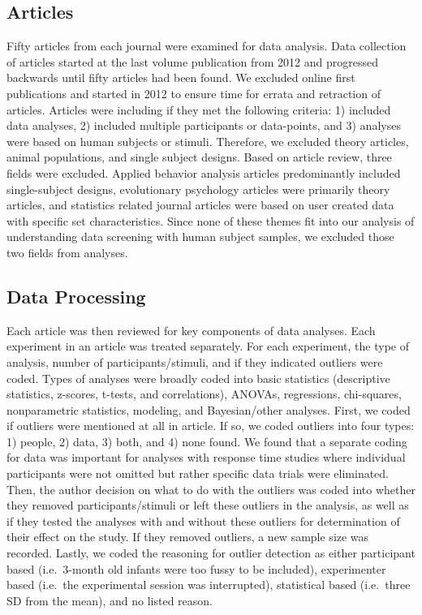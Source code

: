 \documentclass[english,man]{apa6}
\theoremstyle{definition}
\theoremstyle{definition}
\theoremstyle{definition}
\theoremstyle{remark}
\begin{document}
\subsection{Articles}\label{articles}

Fifty articles from each journal were examined for data analysis. Data
collection of articles started at the last volume publication from 2012
and progressed backwards until fifty articles had been found. We
excluded online first publications and started in 2012 to ensure time
for errata and retraction of articles. Articles were including if they
met the following criteria: 1) included data analyses, 2) included
multiple participants or data-points, and 3) analyses were based on
human subjects or stimuli. Therefore, we excluded theory articles,
animal populations, and single subject designs. Based on article review,
three fields were excluded. Applied behavior analysis articles
predominantly included single-subject designs, evolutionary psychology
articles were primarily theory articles, and statistics related journal
articles were based on user created data with specific set
characteristics. Since none of these themes fit into our analysis of
understanding data screening with human subject samples, we excluded
those two fields from analyses.

\subsection{Data Processing}\label{data-processing}

Each article was then reviewed for key components of data analyses. Each
experiment in an article was treated separately. For each experiment,
the type of analysis, number of participants/stimuli, and if they
indicated outliers were coded. Types of analyses were broadly coded into
basic statistics (descriptive statistics, z-scores, t-tests, and
correlations), ANOVAs, regressions, chi-squares, nonparametric
statistics, modeling, and Bayesian/other analyses. First, we coded if
outliers were mentioned at all in article. If so, we coded outliers into
four types: 1) people, 2) data, 3) both, and 4) none found. We found
that a separate coding for data was important for analyses with response
time studies where individual participants were not omitted but rather
specific data trials were eliminated. Then, the author decision on what
to do with the outliers was coded into whether they removed
participants/stimuli or left these outliers in the analysis, as well as
if they tested the analyses with and without these outliers for
determination of their effect on the study. If they removed outliers, a
new sample size was recorded. Lastly, we coded the reasoning for outlier
detection as either participant based (i.e.~3-month old infants were too
fussy to be included), experimenter based (i.e.~the experimental session
was interrupted), statistical based (i.e.~three SD from the mean), and
no listed reason.
\end{document}

